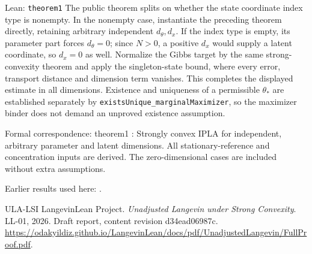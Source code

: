 \documentclass[11pt,a4paper]{report}
\begin{document}
\begin{leanbox}{Lean: \texttt{theorem1}}
The public theorem splits on whether the state coordinate index type is nonempty. In the nonempty case, instantiate the preceding theorem directly, retaining arbitrary independent \(d_\theta,d_x\). If the index type is empty, its parameter part forces \(d_\theta=0\); since \(N>0\), a positive \(d_x\) would supply a latent coordinate, so \(d_x=0\) as well. Normalize the Gibbs target by the same strong-convexity theorem and apply the singleton-state bound, where every error, transport distance and dimension term vanishes. This completes the displayed estimate in all dimensions. Existence and uniqueness of a permissible \(\theta_*\) are established separately by \texttt{exists\allowbreak{}Unique\_\allowbreak{}marginal\allowbreak{}Maximizer}, so the maximizer binder does not demand an unproved existence assumption.



Formal correspondence: theorem1 : Strongly convex IPLA for independent, arbitrary parameter and latent dimensions. All stationary-reference and concentration inputs are derived. The zero-dimensional cases are included without extra assumptions.
\end{leanbox}


Earlier results used here: \cite[Section~3.17.4]{LangevinLean2026ULASC}.

\begin{thebibliography}{ULA-LSI}
LangevinLean Project. \emph{Unadjusted Langevin under Strong Convexity}. LL-01, 2026. Draft report, content revision d34ead06987c. \url{https://odakyildiz.github.io/LangevinLean/docs/pdf/UnadjustedLangevin/FullProof.pdf}.
\end{thebibliography}
\end{document}
